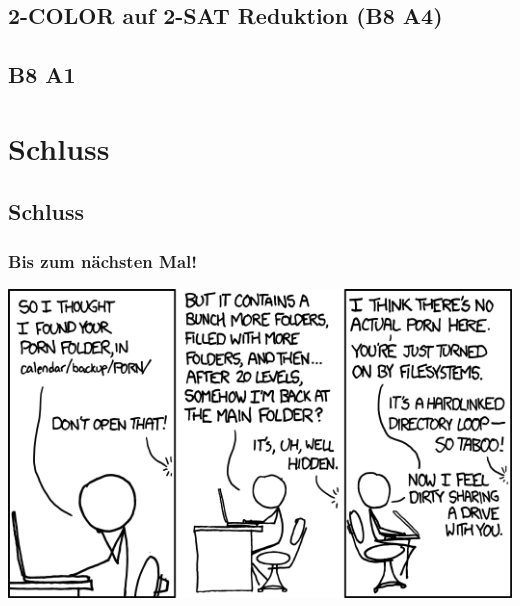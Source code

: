 \subsection{2-COLOR auf 2-SAT Reduktion (B8 A4)}
\subsection{B8 A1}

\section{Schluss}
\subsection{Schluss}
\begin{frame}
\frametitle{Bis zum nächsten Mal!}
\begin{center}
	\includegraphics[width=1 \textheight]{images/xkcd_981.png}
\end{center}
\end{frame}

